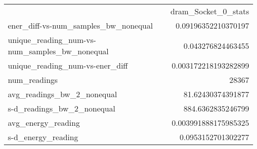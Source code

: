 \begin{tabular}{lr}
\toprule
{} &   dram_Socket_0_stats \\
ener_diff-vs-num_samples_bw_nonequal & 0.09196352210370197 \\
unique_reading_num-vs-num_samples_bw_nonequal & 0.043276824463455 \\
unique_reading_num-vs-ener_diff & 0.003172218193282899 \\
num_readings & 28367 \\
avg_readings_bw_2_nonequal & 81.62430374391877 \\
s-d_readings_bw_2_nonequal & 884.6362835246799 \\
avg_energy_reading & 0.003991888175985325 \\
s-d_energy_reading & 0.0953152701302277 \\
\bottomrule
\end{tabular}